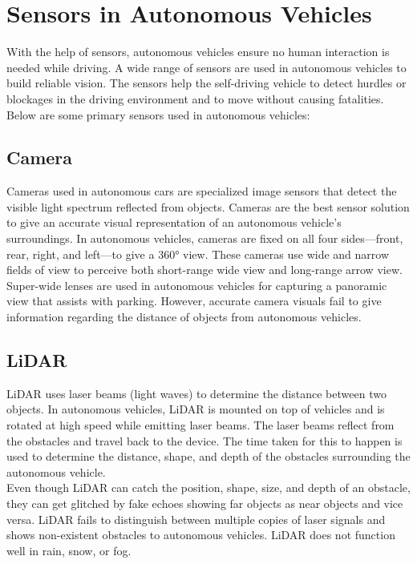 \section{Sensors in Autonomous Vehicles}
With the help of sensors, autonomous vehicles ensure no human interaction is needed while driving. A wide range of sensors are used in autonomous vehicles to build reliable vision. The sensors help the self-driving vehicle to detect hurdles or blockages in the driving environment and to move without causing fatalities.
\\
Below are some primary sensors used in autonomous vehicles:

\subsection{Camera}
Cameras used in autonomous cars are specialized image sensors that detect the visible light spectrum reflected from objects. Cameras are the best sensor solution to give an accurate visual representation of an autonomous vehicle's surroundings. In autonomous vehicles, cameras are fixed on all four sides—front, rear, right, and left—to give a 360° view. These cameras use wide and narrow fields of view to perceive both short-range wide view and long-range arrow view. Super-wide lenses are used in autonomous vehicles for capturing a panoramic view that assists with parking. However, accurate camera visuals fail to give information regarding the distance of objects from autonomous vehicles.

\subsection{LiDAR}
LiDAR uses laser beams (light waves) to determine the distance between two objects. In autonomous vehicles, LiDAR is mounted on top of vehicles and is rotated at high speed while emitting laser beams. The laser beams reflect from the obstacles and travel back to the device. The time taken for this to happen is used to determine the distance, shape, and depth of the obstacles surrounding the autonomous vehicle.
\\
Even though LiDAR can catch the position, shape, size, and depth of an obstacle, they can get glitched by fake echoes showing far objects as near objects and vice versa. LiDAR fails to distinguish between multiple copies of laser signals and shows non-existent obstacles to autonomous vehicles. LiDAR does not function well in rain, snow, or fog. 

